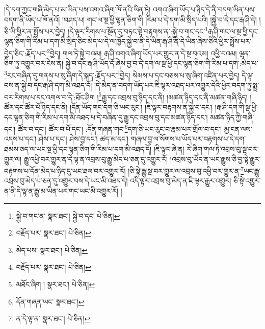 །དེ་དག་ཀྱང་གཞི་མེད་པ་མ་ཡིན་པས་འགའ་ཞིག་ཁོ་ནའི་ཡིན་ཏེ། འགའ་ཞིག་ཡོད་པ་ཉིད་དེ་ནི་བདག་ཡིན་པས་བདག་ནི་ཡོད་པ་ཁོ་ནའོ། །བཤད་པ། གང་ལ་སྔ་ཕྱི་ལྷན་ཅིག་གི །རིམ་པ་དེ་དག་མི་སྲིད་པའི། །སྐྱེ་བ་དེ་དང་རྒ་ཤི་དེ། །ཅི་ཡི་ཕྱིར་ན་སྤྲོས་པར་བྱེད། །དེ་ལྟར་རིགས་པ་སྔོན་དུ་བཏང་སྟེ་བརྟགས་ན་:སྐྱེ་བ་གང་དང་\footnote{སྐྱེ་བ་གང་ན་  སྣར་ཐང་། སྐྱེ་བ་དང་  པེ་ཅིན། }རྒ་ཤི་གང་ལ་སྔ་ཕྱི་དང་ལྷན་ཅིག་གི་རིམ་པ་དག་མི་སྲིད་ཅིང་མེད་པ་དེ་ལ་ཁྱོད་སྐྱེ་བ་ནི་དེ་ཡིན་རྒ་ཤི་ནི་དེ་ཡིན་ཞེས་ཅིའི་ཕྱིར་སྤྲོས་པར་བྱེད་ཅིང་:རྗོད་པར་\footnote{བརྗོད་པར་  སྣར་ཐང་།  པེ་ཅིན། }བྱེད། གལ་ཏེ་སྐྱེ་བའམ། རྒ་ཤི་འགའ་ཞིག་ཡོད་པར་གྱུར་ན་དེ་སྔ་བའམ། འཕྱི་བའམ། ལྷན་ཅིག་ཏུ་འགྱུར་བར་ངེས་ན། སྐྱེ་བ་དང་རྒ་ཤི་ཡོད་དོ་ཞེས་བྱ་བ་དེ་དག་ལ་སྔ་ཕྱི་དང་ལྷན་ཅིག་གི་རིམ་པ་དག་:མེད་པ་\footnote{མེད་པས་  སྣར་ཐང་།  པེ་ཅིན། }རང་བཞིན་དུ་གནས་པ་སུ་ཞིག་དེ་སྐད་:རྗོད་པར་\footnote{བརྗོད་པར་  སྣར་ཐང་།  པེ་ཅིན། }བྱེད། སེམས་པ་དང་བཅས་པ་སུ་ཞིག་འཛིན་པར་བྱེད། དེ་ལྟ་བས་ན་སྐྱེ་བ་དང་རྒ་ཤི་དག་མི་འཐད་དོ། །དེ་མེད་ན་བདག་ཡོད་པར་ཇི་ལྟར་འཐད་པར་འགྱུར་དེའི་ཕྱིར་བདག་ཏུ་སྨྲ་བར་རིགས་པ་དང་འགལ་བ་དེ་:ཐོང་ཤིག །\footnote{མཐོང་ཞིག །  སྣར་ཐང་།  པེ་ཅིན། }རྒྱུ་དང་འབྲས་བུ་ཉིད་དང་ནི། །མཚན་ཉིད་དང་ནི་མཚན་གཞི་ཉིད། །ཚོར་དང་ཚོར་པོ་ཉིད་དང་ནི། །དོན་ཡོད་གང་དག་ཅི་ཡང་རུང་། །ཇི་ལྟར་བརྟགས་ན་སྐྱེ་བ་དང་། །རྒ་ཤི་དག་གི་སྔ་ཕྱི་དང་ལྷན་ཅིག་གི་རིམ་པ་དག་མི་འཐད་པ་དེ་བཞིན་དུ་རྒྱུ་དང་འབྲས་བུ་དང་མཚན་ཉིད་དང་། མཚན་ཉིད་ཀྱི་གཞི་དང་། ཚོར་བ་དང་། ཚོར་བ་པོ་དང་། :དོན་གཞན་གང་\footnote{དོན་གཞན་ཡང་  སྣར་ཐང་། }དག་ཅི་ཡང་རུང་བ་རྣམ་པར་གྲོལ་བ་དང་། མྱ་ངན་ལས་འདས་པ་དང་། ཤེས་པ་དང་། ཤེས་བྱ་དང་། ཚད་མ་དང་། གཞལ་བྱ་ལ་སོགས་པ་ཡོད་པར་བརྟགས་པ་དེ་དག་ཐམས་ཅད་ལ་ཡང་སྔ་ཕྱི་དང་ལྷན་ཅིག་གི་རིམ་པ་དག་མི་འཐད་དོ། །ཇི་ལྟར་ཞེ་ན། རེ་ཞིག་གལ་ཏེ་འབྲས་བུ་སྔ་བར་གྱུར་ལ། རྒྱུ་འཕྱི་བར་གྱུར་ན་དེ་ལྟ་ན་འབྲས་བུ་རྒྱུ་མེད་པ་ཅན་དུ་འགྱུར་རོ། །འབྲས་བུ་ཡོད་ན་ཡང་རྒྱུས་ཅི་བྱ་སྟེ་རྒྱུར་བརྟགས་པ་དོན་མེད་པ་ཉིད་དུ་ཡང་ཐལ་བར་འགྱུར་རོ། །ཅི་སྟེ་རྒྱུ་སྔ་བར་གྱུར་ལ་འབྲས་བུ་འཕྱི་བར་གྱུར་ན་\footnote{ན་དེ་ལྟ་ན་  སྣར་ཐང་།  པེ་ཅིན། }ཡང་རྒྱུ་འབྲས་བུ་མེད་པ་ཅན་དུ་འགྱུར་བས་དེ་ཡང་མི་འཐད་དེ། འདི་ལྟར་འབྲས་བུ་མེད་ན་ཇི་ལྟར་རྒྱུར་འགྱུར། ཅི་སྟེ་འགྱུར་ན་ནི་དེ་ལྟ་ན་རྒྱུ་མ་ཡིན་པར་གང་ཡང་མི་འགྱུར་རོ། །
